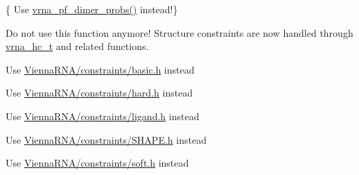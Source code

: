 \begin{DoxyRefList}
\item[Global \mbox{\hyperlink{group__part__func__global__deprecated_ga94c19120130e66a667a10a3c8598550c}{compute\+\_\+probabilities}} (double FAB, double FEA, double FEB, vrna\+\_\+ep\+\_\+t $\ast$pr\+AB, vrna\+\_\+ep\+\_\+t $\ast$prA, vrna\+\_\+ep\+\_\+t $\ast$prB, int Alength)]\label{deprecated__deprecated000115}%
%
\{ Use \mbox{\hyperlink{group__thermodynamics_gaa1e39e73afb51fbaf4ae38f0c066c46b}{vrna\+\_\+pf\+\_\+dimer\+\_\+probs()}} instead!\} 
\item[Global \mbox{\hyperlink{hard_8h_a36c3a6c3218b041f992052767bc74549}{constrain\+\_\+ptypes}} (const char $\ast$constraint, unsigned int length, char $\ast$ptype, int $\ast$\+BP, int min\+\_\+loop\+\_\+size, unsigned int idx\+\_\+type)]\label{deprecated__deprecated000162}%
%
Do not use this function anymore! Structure constraints are now handled through \mbox{\hyperlink{group__hard__constraints_gac7e4c4f8abe3163a68110c5bff24e01d}{vrna\+\_\+hc\+\_\+t}} and related functions. 
\item[File \mbox{\hyperlink{constraints_8h}{constraints.h}} ]\label{deprecated__deprecated000040}%
%
Use \mbox{\hyperlink{constraints_2basic_8h}{Vienna\+RNA/constraints/basic.\+h}} instead  
\item[File \mbox{\hyperlink{constraints__hard_8h}{constraints\+\_\+hard.h}} ]\label{deprecated__deprecated000041}%
%
Use \mbox{\hyperlink{hard_8h}{Vienna\+RNA/constraints/hard.\+h}} instead  
\item[File \mbox{\hyperlink{constraints__ligand_8h}{constraints\+\_\+ligand.h}} ]\label{deprecated__deprecated000042}%
%
Use \mbox{\hyperlink{ligand_8h}{Vienna\+RNA/constraints/ligand.\+h}} instead  
\item[File \mbox{\hyperlink{constraints__SHAPE_8h}{constraints\+\_\+\+SHAPE.h}} ]\label{deprecated__deprecated000043}%
%
Use \mbox{\hyperlink{SHAPE_8h}{Vienna\+RNA/constraints/\+SHAPE.\+h}} instead  
\item[File \mbox{\hyperlink{constraints__soft_8h}{constraints\+\_\+soft.h}} ]\label{deprecated__deprecated000044}%
%
Use \mbox{\hyperlink{soft_8h}{Vienna\+RNA/constraints/soft.\+h}} instead  
\item[File \mbox{\hyperlink{convert__epars_8h}{convert\+\_\+epars.h}} ]\label{deprecated__deprecated000045}%

\end{DoxyRefList}

